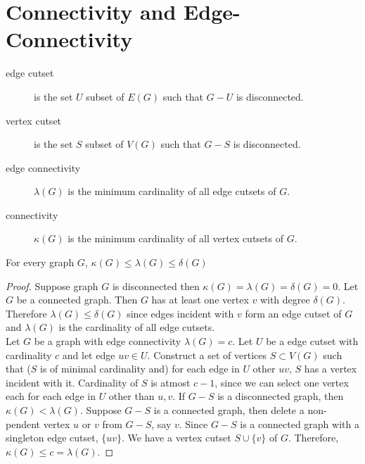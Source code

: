 
\setcounter{section}{4}
\section{Connectivity and Edge-Connectivity}
\begin{description}
	\item[edge cutset] is the set $U$ subset of $E(G)$ such that $G-U$ is disconnected.
	\item[vertex cutset] is the set $S$ subset of $V(G)$ such that $G-S$ is disconnected.
	\item[edge connectivity] $\lambda(G)$ is the minimum cardinality of all edge cutsets of $G$.
	\item[connectivity] $\kappa(G)$ is the minimum cardinality of all vertex cutsets of $G$.
\end{description}
\begin{theorem}
	For every graph $G$, $\kappa(G) \le \lambda(G) \le \delta(G)$
\end{theorem}
\begin{proof}
	Suppose graph $G$ is disconnected then $\kappa(G) = \lambda(G) = \delta(G) = 0$. Let $G$ be a connected graph. Then $G$ has at least one vertex $v$ with degree $\delta(G)$. Therefore $\lambda(G) \le \delta(G)$ since edges incident with $v$ form an edge cutset of $G$ and $\lambda(G)$ is the cardinality of all edge cutsets.\\

	Let $G$ be a graph with edge connectivity $\lambda(G) = c$. Let $U$ be a edge cutset with cardinality $c$ and let edge $uv \in U$. Construct a set of vertices $S \subset V(G)$ such that ($S$ is of minimal cardinality and) for each edge in $U$ other $uv$, $S$ has a vertex incident with it. Cardinality of $S$ is atmost $c-1$, since we can select one vertex each for each edge in $U$ other than $u, v$. If $G-S$ is a disconnected graph, then $\kappa(G) < \lambda(G)$. Suppose $G-S$ is a connected graph, then delete a non-pendent vertex $u$ or $v$ from $G-S$, say $v$. Since $G-S$ is a connected graph with a singleton edge cutset, $\{ uv \}$. We have a vertex cutset $S \cup \{ v\}$ of $G$. Therefore, $\kappa(G) \le c = \lambda(G)$.
\end{proof}
